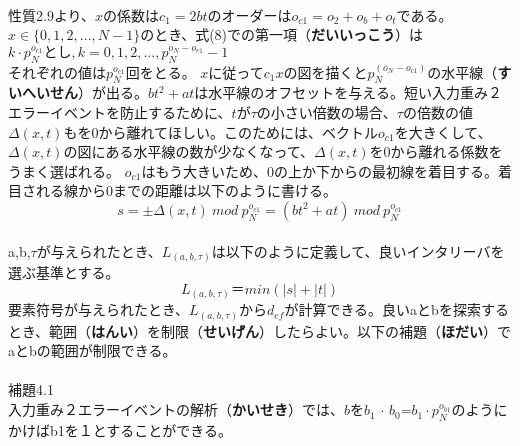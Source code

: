 \documentclass[24 pts]{article}
\begin{document}
\paragraph{}
性質2.9より、$x$の係数は$c_1=2bt$のオーダーは$o_{c1}=o_2+o_b+o_t$である。$x\in\{0,1,2,...,N-1\}$のとき、式(8)での第一項（\textbf{だいいっこう}）は$k\cdot p_N^{o_{c1}}とし,k=0,1,2,...,p_N^{o_N-o_{c1}}-1$\\それぞれの値は$p_N^{o_{c1}}$回をとる。
$x$に従って$c_1x$の図を描くと$p_N^{(o_N-o_{c1})}$の水平線（\textbf{すいへいせん}）が出る。$bt^2+at$は水平線のオフセットを与える。短い入力重み２エラーイベントを防止するために、$t$が$\tau$の小さい倍数の場合、$\tau$の倍数の値$\Delta(x,t)$もを0から離れてほしい。このためには、ベクトル$o_{c1}$を大きくして、$\Delta(x,t)$の図にある水平線の数が少なくなって、$\Delta(x,t)$を0から離れる係数をうまく選ばれる。
$o_{c1}$はもう大きいため、0の上か下からの最初線を着目する。着目される線から0までの距離は以下のように書ける。
\begin{equation}\tag{9}
s=\pm \Delta(x,t) \ mod \ p_N^{o_{c1}} =( bt^2+at) \ mod \ p_N^{o_{c1}}
\end{equation}
\paragraph{}
a,b,$\tau$が与えられたとき、$L_{(a,b,\tau)}$は以下のように定義して、良いインタリーバを選ぶ基準とする。
$$L_{(a,b,\tau)}＝min⁡(|s|+|t|)$$
要素符号が与えられたとき、$L_(a,b,\tau)$から$d_{ef}$が計算できる。良いaとbを探索するとき、範囲（\textbf{はんい}）を制限（\textbf{せいげん}）したらよい。以下の補題（\textbf{ほだい}）でaとbの範囲が制限できる。
\paragraph{}
補題4.1\\
入力重み２エラーイベントの解析（\textbf{かいせき}）では、$b$を$b_1$ $\cdot$  $b_0$=$b_1 \cdot p_N^{o_{b1}}$のようにかけばb1を１とすることができる。
\end{document}

